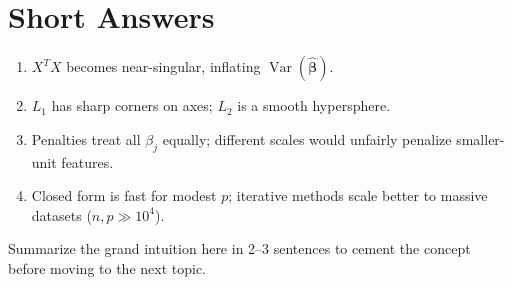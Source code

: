 \documentclass[11pt,a4paper,oneside]{book}
\newcommand{\Var}{\operatorname{Var}}
\newcommand{\bhat}{\widehat{\boldsymbol{\beta}}}
\begin{document}
\section{Short Answers}
\begin{enumerate}
  \item $X^TX$ becomes near-singular, inflating $\Var(\bhat)$.
  \item $L_1$ has sharp corners on axes; $L_2$ is a smooth hypersphere.
  \item Penalties treat all $\beta_j$ equally; different scales would unfairly penalize smaller-unit features.
  \item Closed form is fast for modest $p$; iterative methods scale better to massive datasets ($n, p \gg 10^4$).
\end{enumerate}

\begin{keyidea}[title=Final Mental Model]
Summarize the grand intuition here in 2--3 sentences to cement the concept before moving to the next topic.
\end{keyidea}
\end{document}

